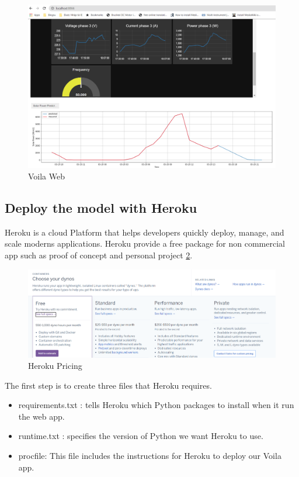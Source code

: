 \begin{figure}[H]
	\centering
    \includegraphics[width=0.8\columnwidth]{Pictures/Voila web example.png}
	\caption[Short title]{Voila Web}
	\label{figure:Voila Web}
\end{figure}


\subsection{Deploy the model with Heroku}

Heroku is a cloud Platform that helps developers quickly deploy, manage, and scale moderns applications. Heroku provide a free package for non commercial app such as proof of concept and personal project \ref{figure:Heroku pricing}.

\begin{figure}[H]
	\centering
    \includegraphics[width=0.8\columnwidth]{Pictures/Heroku packages.png}
	\caption[Short title]{Heroku Pricing}
	\label{figure:Heroku pricing}
\end{figure}

The first step is to create three files that Heroku requires.

\begin{itemize}
    \item requirements.txt : tells Heroku which Python packages to install when it run the web app.
    \item runtime.txt : specifies the version of Python we want Heroku to use.
    \item procfile: This file includes the instructions for Heroku to deploy our Voila app.
\end{itemize}

